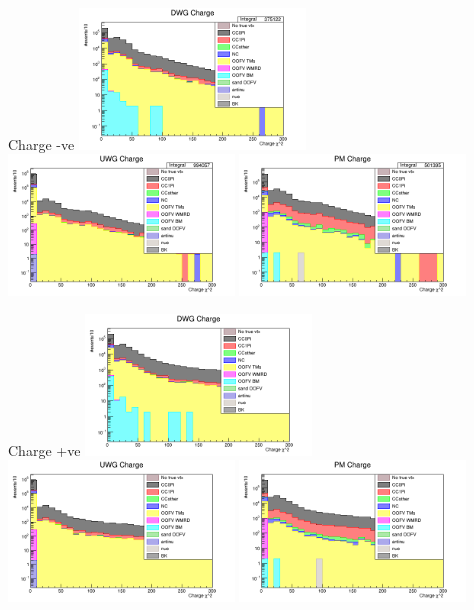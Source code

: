 \documentclass[%
 reprint,
 amsmath,amssymb,
 aps,
]{revtex4-2}
\begin{document}
\begin{frame}{Charge -ve}
    \includegraphics[width=0.45\textwidth]{images/charge_neg_chi2_wgbm_topo_DWG_accum_level[][26]_data_mc.png}
    \includegraphics[width=0.45\textwidth]{images/charge_neg_chi2_wgbm_topo_UWG_accum_level[][16]_data_mc.png}
    \includegraphics[width=0.45\textwidth]{images/charge_neg_chi2_wgbm_topo_PM_accum_level[][06]_data_mc.png}
\end{frame}

\begin{frame}{Charge +ve}
    \includegraphics[width=0.45\textwidth]{images/charge_pos_chi2_wgbm_topo_DWG_accum_level[][26]_data_mc.png}
    \includegraphics[width=0.45\textwidth]{images/charge_pos_chi2_wgbm_topo_UWG_accum_level[][16]_data_mc.png}
    \includegraphics[width=0.45\textwidth]{images/charge_pos_chi2_wgbm_topo_PM_accum_level[][06]_data_mc.png}
\end{frame}
\end{document}
